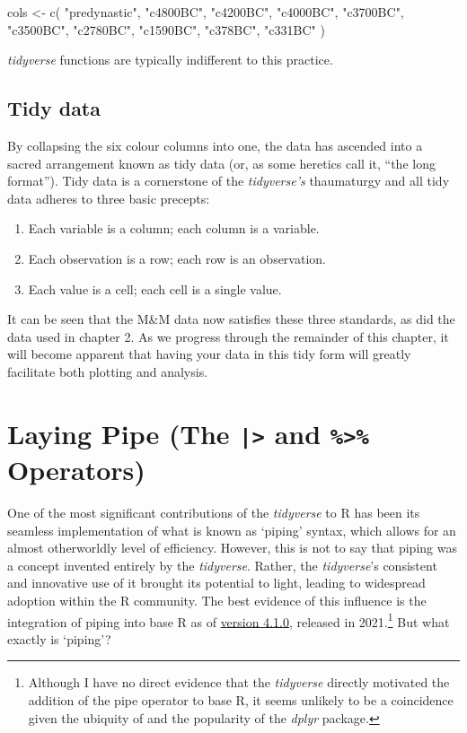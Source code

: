 \begin{inR}
cols <- c(
  "predynastic", "c4800BC", "c4200BC", "c4000BC", "c3700BC",
  "c3500BC", "c2780BC", "c1590BC", "c378BC", "c331BC"
)
\end{inR}
\vspace{1em}

\noindent
\textit{tidyverse} functions are typically indifferent to this practice.

\subsection{Tidy data}

By collapsing the six colour columns into one, the data has ascended into a sacred arrangement known as \gls{tidy data} (or, as some heretics call it, ``the long format'').  Tidy data is a cornerstone of the \textit{tidyverse's} thaumaturgy and all tidy data adheres to three basic precepts:

\begin{minipage}{\textwidth}

\begin{enumerate}[label=\Roman*.]
\IMFellEnglish
    \item Each variable is a column; each column is a variable.
    \item Each observation is a row; each row is an observation.
    \item Each value is a cell; each cell is a single value.
\end{enumerate}
\end{minipage}

\noindent
It can be seen that the M\&M data now satisfies these three standards, as did the  data used in chapter 2. As we progress through the remainder of this chapter, it will become apparent that having your data in this tidy form will greatly facilitate both plotting and analysis. 


\section{Laying Pipe (The \texttt{|>} and \texttt{\%>\%} Operators)}

One of the most significant contributions of the \textit{tidyverse} to R has been its seamless implementation of what is known as `piping' syntax, which allows for an almost otherworldly level of efficiency. However, this is not to say that piping was a concept invented entirely by the \textit{tidyverse}. Rather, the \textit{tidyverse}'s consistent and innovative use of it brought its potential to light, leading to widespread adoption within the R community. The best evidence of this influence is the integration of piping into base R as of \href{https://stat.ethz.ch/pipermail/r-announce/2021/000670.html}{version 4.1.0}, released in 2021.\footnote{Although I have no direct evidence that the \textit{tidyverse} directly motivated the addition of the pipe operator to base R, it seems unlikely to be a coincidence given the ubiquity of \R{\%>\%} and the popularity of the \textit{dplyr} package.} But what exactly is `piping'?

